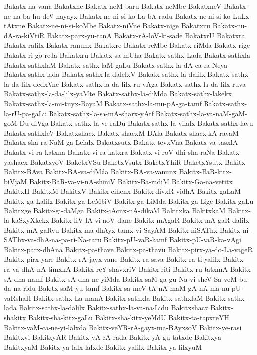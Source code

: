 {Bakatx-na-vana
Bakatxne
Bakatx-neM-baru
Bakatx-neMbe
BakatxneV
Bakatx-ne-na-ba-hu-deV-nayayx
Bakatx-ne-ni-si-ko-La-bA-radu
Bakatx-ne-ni-si-ko-LuLx-tAtxne
Bakatx-ne-ni-si-koMbe
Bakatx-niVne
Bakatx-nige
Bakatxnu
Bakatx-nu-dA-ra-kiVtiR
Bakatx-parx-yu-tanA
Bakatx-rA-loV-ki-sade
BakatxrU
Bakatxra
Bakatx-ralilx
Bakatx-ranunx
Bakatxre
Bakatx-reMbe
Bakatx-riMda
Bakatx-rige
Bakatx-ri-go-reda
Bakatxru
Bakatx-sa-mUha
Bakatx-sathx-Lada
Bakatx-sathxla
Bakatx-sathxlaM
Bakatx-sathx-laM-gaLu
Bakatx-sathx-la-dA-ca-ra-Neya
Bakatx-sathx-lada
Bakatx-sathx-la-dalelxV
Bakatx-sathx-la-dalilx
Bakatx-sathx-la-da-lilx-dedxVne
Bakatx-sathx-la-da-lilx-ru-vAga
Bakatx-sathx-la-da-lilx-ruva
Bakatx-sathx-la-da-lilx-yaMte
Bakatx-sathx-la-diMda
Bakatx-sathx-lakekx
Bakatx-sathx-la-mi-tuyx-BayaM
Bakatx-sathx-la-mu-pA-ga-tamf
Bakatx-sathx-la-rU-pa-gaLu
Bakatx-sathx-la-sa-mA-sharx-yAtf
Bakatx-sathx-la-va-naM-gaM-goM-Du-diVga
Bakatx-sathx-la-ve-raDu
Bakatx-sathx-la-vilalx
Bakatx-sathx-lavu
Bakatx-sathxleV
Bakatxshacx
Bakatx-shacxM-DAla
Bakatx-shacx-kA-ravaM
Bakatx-sha-ra-NaM-ga-Lelalx
Bakatxsutx
Bakatx-tevxVna
Bakatx-va-tasxlA
Bakatx-vi-ra-katxna
Bakatx-vi-ra-katxra
Bakatx-vi-roV-dhi-sha-raNa
Bakatx-yashacx
BakatxyoV
BaketxVSu
BaketxVsutx
BaketxYhiR
BaketxYsutx
Bakitx
Bakitx-BAva
Bakitx-BA-va-diMda
Bakitx-BA-va-vanunx
Bakitx-BaR-kitx-biVjaM
Bakitx-BaR-va-vi-nA-shiniV
Bakitx-Ba-radiM
Bakitx-Ga-na-vetitx
BakitxH
BakitxM
BakitxV
Bakitx-cihenx
Bakitx-divxR-vidhA
Bakitx-gaLaM
Bakitx-ga-Lalilx
Bakitx-ga-LeMbiV
Bakitx-ga-LiMda
Bakitx-ga-Lige
Bakitx-gaLu
Bakitxge
Bakitx-gi-daMga
Bakitx-jAcnx-nA-dikaM
Bakitxka
BakitxkaM
Bakitx-la-kaSxyXkekx
Bakitx-liV-lA-vi-noV-dane
Bakitx-mAgaR
Bakitx-mA-gaR-dalilx
Bakitx-mA-gaRvu
Bakitx-ma-dhAyx-tamx-vi-SayAM
Bakitx-niSAThx
Bakitx-ni-SAThx-va-dhA-na-pa-ri-Na-taru
Bakitx-pU-vaR-kamf
Bakitx-pU-vaR-ka-vAgi
Bakitx-parx-dhAna
Bakitx-pa-thave
Bakitx-pa-thavu
Bakitx-pirx-ya-do-La-vageR
Bakitx-pirx-yare
Bakitx-rA-jayx-vane
Bakitx-ra-sava
Bakitx-ra-ti-yalilx
Bakitx-ra-va-dhA-nA-timxkA
Bakitx-reY-shavxriV
Bakitx-riti
Bakitx-ru-tatxmA
Bakitx-sA-dha-namf
Bakitx-sA-dha-ne-yiMda
Bakitx-saM-ga-gu-Na-vi-sheV-Sa-veM-bu-da-na-ridu
Bakitx-saM-yu-tamf
Bakitx-sa-meV-tA-nA-maM-gA-nA-ma-nu-pU-vaRshaH
Bakitx-sathx-La-manA
Bakitx-sathxla
Bakitx-sathxlaM
Bakitx-sathx-lada
Bakitx-sathx-la-dalilx
Bakitx-sathx-la-va-na-Lidu
Bakitxshacx
Bakitx-shakitx
Bakitx-sha-kitx-gaLu
Bakitx-sha-kitx-yeMdU
Bakitx-ta-tapxreYH
Bakitx-vaM-ca-ne-yi-lalxda
Bakitx-veYR-rA-gayx-ma-BAyxsoV
Bakitx-ve-rasi
Bakitxvi
BakitxyAR
Bakitx-yA-cA-rada
Bakitx-yA-gu-tatxde
Bakitxya
BakitxyaM
Bakitx-ya-lalx-lalxde
Bakitx-yalilx
Bakitx-ya-lilxyuM
}
